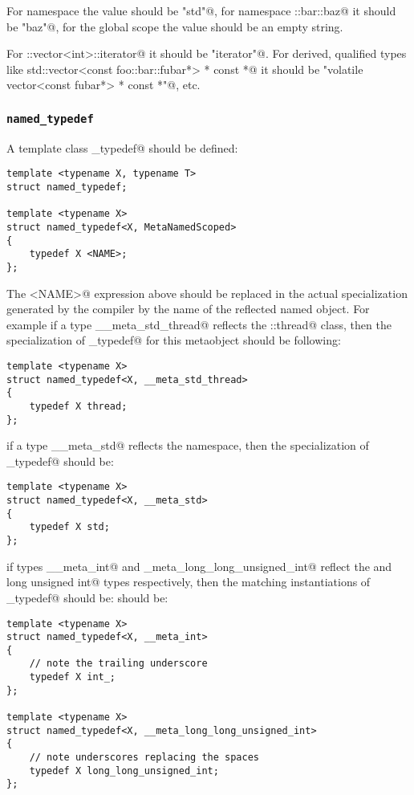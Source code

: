 For namespace \verb@std@ the value should be \verb@"std"@, for namespace
\verb@foo::bar::baz@ it should be \verb@"baz"@, for the global scope the
value should be an empty string.

For \verb@std::vector<int>::iterator@ it should be \verb@"iterator"@. For derived,
qualified types like \verb@volatile std::vector<const foo::bar::fubar*> * const *@
it should be \verb@"volatile vector<const fubar*> * const *"@, etc.


\subsubsection{\texttt{named\_typedef}}

A template class \verb@named_typedef@ should be defined:

\begin{lstlisting}
template <typename X, typename T>
struct named_typedef;

template <typename X>
struct named_typedef<X, MetaNamedScoped>
{
	typedef X <NAME>;
};
\end{lstlisting}

The \verb@<NAME>@ expression above should be replaced in the actual specialization generated by the compiler
by the name of the reflected named object. For example if a type \verb@__meta_std_thread@
reflects the \verb@std::thread@ class, then the specialization of \verb@named_typedef@
for this metaobject should be following:

\begin{lstlisting}
template <typename X>
struct named_typedef<X, __meta_std_thread>
{
	typedef X thread;
};
\end{lstlisting}

if a type \verb@__meta_std@ reflects the \verb@std@ namespace, then the specialization of \verb@named_typedef@
should be:

\begin{lstlisting}
template <typename X>
struct named_typedef<X, __meta_std>
{
	typedef X std;
};
\end{lstlisting}

if types \verb@__meta_int@ and \verb@_meta_long_long_unsigned_int@ reflect the \verb@int@ and \verb@long long unsigned int@
types respectively, then the matching instantiations of \verb@named_typedef@ should be:
should be:

\begin{lstlisting}
template <typename X>
struct named_typedef<X, __meta_int>
{
	// note the trailing underscore
	typedef X int_;
};

template <typename X>
struct named_typedef<X, __meta_long_long_unsigned_int>
{
	// note underscores replacing the spaces
	typedef X long_long_unsigned_int;
};
\end{lstlisting}


